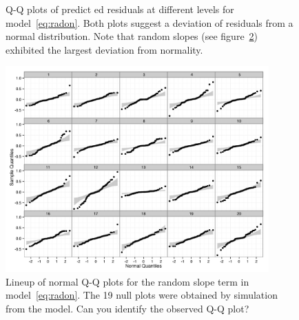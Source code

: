 \documentclass[12pt]{article} %
\newcommand{\hh}[1]{{\color{orange} #1}}
\newcommand{\al}[1]{{\color{red} #1}}
\begin{document}
\begin{figure}[!h]
	\centering
	\caption{\label{fig:qqplots1} Q-Q plots of predict\al{ed residuals} at different levels %
	for model~\eqref{eq:radon}. \hh{Both plots suggest a deviation of residuals from a normal distribution.} Note that random slopes (see figure~\ref{fig:lineup}) exhibited the largest deviation from normality. }
\end{figure}

\begin{figure}[htb]
	\centering
	\includegraphics[width=0.9\textwidth]{test.jpeg}%
	\caption{\label{fig:lineup} Lineup of normal Q-Q plots for the random slope term in model~\eqref{eq:radon}. The 19 null plots were obtained by simulation from the model. Can you identify the observed Q-Q plot? }
\end{figure}
\end{document}
